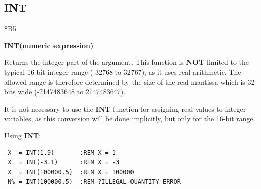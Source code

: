 
\newpage
\subsection{INT}
\begin{description}[leftmargin=2cm,style=nextline]
\item [Token:] \$B5
\item [Format:] {\bf INT(numeric expression)}
\item [Usage:] Returns the integer part of the argument.
               This function is {\bf NOT} limited to the typical
               16-bit integer range (-32768 to 32767), as
               it uses real arithmetic. The allowed range is
               therefore determined by the size of the real
               mantissa which is 32-bits wide (-2147483648 to 2147483647).

\item [Remarks:] It is not necessary to use the {\bf INT}
               function for assigning real values to integer
               variables, as this conversion will be done
               implicitly, but only for the 16-bit range.

\item [Examples:] Using {\bf INT}:
\begin{tcolorbox}[colback=black,coltext=white]
\verbatimfont{\codefont}
\begin{verbatim}
 X  = INT(1.9)       :REM X = 1
 X  = INT(-3.1)      :REM X = -3
 X  = INT(100000.5)  :REM X = 100000
 N% = INT(100000.5)  :REM ?ILLEGAL QUANTITY ERROR
\end{verbatim}
\end{tcolorbox}
\end{description}


\newpage
